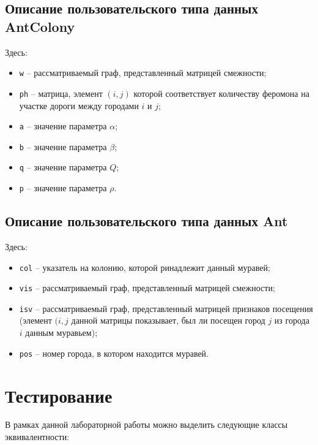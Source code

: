 \subsection{Описание пользовательского типа данных AntColony}


Здесь:
\begin{itemize}
    \item \texttt{w} -- рассматриваемый граф, представленный матрицей смежности;
    \item \texttt{ph} -- матрица, элемент $(i, j)$ которой соответствует количеству феромона на участке дороги между городами $i$ и $j$;
    \item \texttt{a} -- значение параметра $\alpha$;
    \item \texttt{b} -- значение параметра $\beta$;
    \item \texttt{q} -- значение параметра $Q$;
    \item \texttt{p} -- значение параметра $\rho$.
\end{itemize}

\subsection{Описание пользовательского типа данных Ant}


Здесь:
\begin{itemize}
    \item \texttt{col} -- указатель на колонию, которой ринадлежит данный муравей;
    \item \texttt{vis} -- рассматриваемый граф, представленный матрицей смежности;
    \item \texttt{isv} -- рассматриваемый граф, представленный матрицей признаков посещения (элемент $(i, j$ данной матрицы показывает, был ли посещен город $j$ из города $i$ данным муравьем);
    \item \texttt{pos} -- номер города, в котором находится муравей.
\end{itemize}

\section{Тестирование}

В рамках данной лабораторной работы можно выделить следующие классы эквивалентности:

